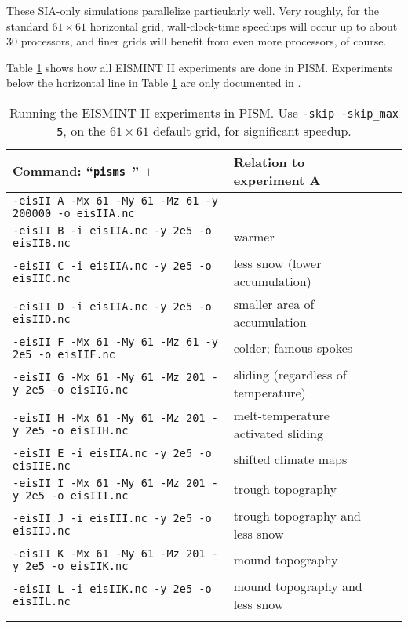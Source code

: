 These SIA-only simulations parallelize particularly well.  Very roughly, for the standard $61\times 61$ horizontal grid, wall-clock-time speedups will occur up to about 30 processors, and finer grids will benefit from even more processors, of course.

Table \ref{tab:eisII} shows how all EISMINT II experiments are done in PISM.  Experiments below the horizontal line in Table \ref{tab:eisII} are only documented in \cite{EISIIdescribe}.

\begin{table}[ht]
\centering
\small
\begin{tabular}{@{}llll}\toprule
\textbf{Command: ``\texttt{pisms }'' $+$} & \textbf{Relation to experiment A} \\
\midrule
\texttt{-eisII A -Mx 61 -My 61 -Mz 61 -y 200000 -o eisIIA.nc} & \\
\texttt{-eisII B -i eisIIA.nc -y 2e5 -o eisIIB.nc} & warmer \\
\texttt{-eisII C -i eisIIA.nc -y 2e5 -o eisIIC.nc} & less snow (lower accumulation)\\
\texttt{-eisII D -i eisIIA.nc -y 2e5 -o eisIID.nc} & smaller area of accumulation \\
\texttt{-eisII F -Mx 61 -My 61 -Mz 61 -y 2e5 -o eisIIF.nc} & colder; famous spokes \cite{BBL} \\
\texttt{-eisII G -Mx 61 -My 61 -Mz 201 -y 2e5 -o eisIIG.nc} & sliding (regardless of temperature) \\
\texttt{-eisII H -Mx 61 -My 61 -Mz 201 -y 2e5 -o eisIIH.nc} & melt-temperature activated sliding \\ \midrule
\texttt{-eisII E -i eisIIA.nc -y 2e5 -o eisIIE.nc} & shifted climate maps \\
\texttt{-eisII I -Mx 61 -My 61 -Mz 201 -y 2e5 -o eisIII.nc} & trough topography \\
\texttt{-eisII J -i eisIII.nc -y 2e5 -o eisIIJ.nc} & trough topography and less snow \\
\texttt{-eisII K -Mx 61 -My 61 -Mz 201 -y 2e5 -o eisIIK.nc} & mound topography \\
\texttt{-eisII L -i eisIIK.nc -y 2e5 -o eisIIL.nc} & mound topography and less snow \\
\bottomrule
\normalsize
\end{tabular}
\caption{Running the EISMINT II experiments in PISM.  Use \texttt{-skip -skip_max 5}, on the $61\times 61$ default grid, for significant speedup.}
\label{tab:eisII}
\end{table}

